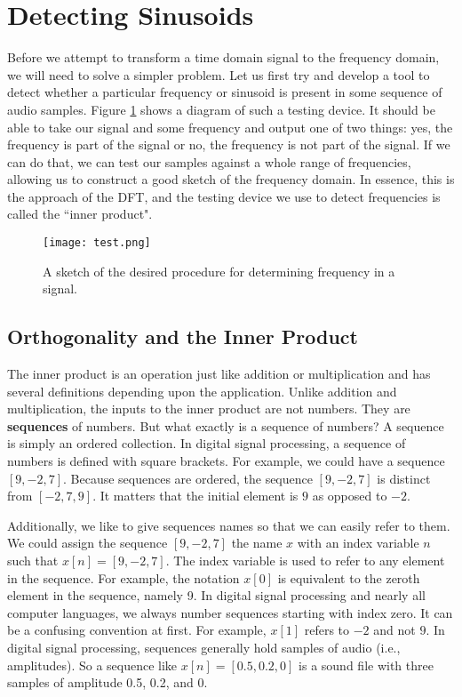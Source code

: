 \section*{Detecting Sinusoids}

Before we attempt to transform a time domain signal to the frequency domain, we will need to solve
a simpler problem.  Let us first try and develop a tool to detect whether a particular frequency or
sinusoid is present in some sequence of audio samples. Figure 
\ref{fig:test} shows a diagram of such a testing device.  It should be able to take our signal and some frequency
and output one of two things: yes, the frequency is part of the signal or no, the frequency is not part of the signal.
If we can do that, we can test our samples against
a whole range of frequencies, allowing us to construct a good sketch of the frequency domain.   In essence,
 this is the approach of the DFT, and the testing device we use to detect frequencies is called the ``inner product".
 
 \begin{figure}[h]
 	\caption{A sketch of the desired procedure for determining frequency in a signal.}
 	\centering
 	\texttt{[image: test.png]}
 	\label{fig:test}
 \end{figure}

\subsection*{Orthogonality and the Inner Product}

The inner product is an operation just like addition or multiplication and has several definitions depending
upon the application.  Unlike addition and multiplication, the inputs to the inner product are not numbers.
They are \textbf{sequences} of numbers.
But what exactly is a sequence of numbers?  A sequence
is simply an ordered collection.  In digital signal 
processing, a sequence of numbers is defined with square brackets.  For example, we could have a sequence
$[9, -2, 7]$.  Because sequences are ordered, the sequence $[9, -2, 7]$ is distinct from $[-2, 7, 9]$.  It matters
that the initial element is $9$ as opposed to $-2$.  

Additionally, we like to give sequences names so that we can easily refer to them.  
We could assign the sequence $[9, -2, 7]$ the name $x$ with an index variable $n$ such that 
$x[n] = [9, -2, 7]$.  The index variable is used to refer to any element in the sequence.  For example,
the notation $x[0]$ is equivalent to the zeroth element in the sequence, namely 9.  In digital signal processing
and nearly all computer languages, we always number sequences starting with index zero.  It can
be a confusing convention at first.  For example, $x[1]$ refers to $-2$ and not $9$.  In digital signal processing,
sequences generally hold samples of audio (i.e., amplitudes).  So a sequence like $x[n] = [0.5, 0.2, 0]$ is a sound file with three samples of amplitude 0.5, 0.2, and 0.

